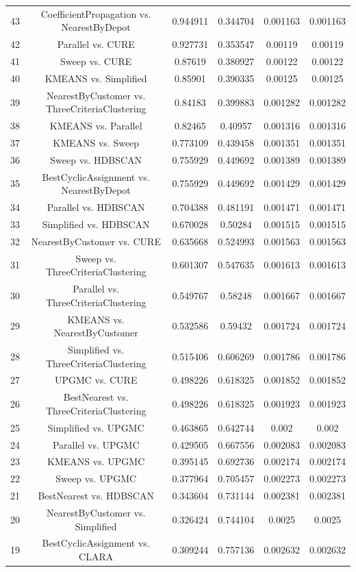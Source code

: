 \documentclass[a4paper,10pt]{article}
\begin{document}
\begin{landscape}
\begin{table}[!htp]
\begin{tabular}{cccccc}
43&CoefficientPropagation vs. NearestByDepot&0.944911&0.344704&0.001163&0.001163\\
42&Parallel vs. CURE&0.927731&0.353547&0.00119&0.00119\\
41&Sweep vs. CURE&0.87619&0.380927&0.00122&0.00122\\
40&KMEANS vs. Simplified&0.85901&0.390335&0.00125&0.00125\\
39&NearestByCustomer vs. ThreeCriteriaClustering&0.84183&0.399883&0.001282&0.001282\\
38&KMEANS vs. Parallel&0.82465&0.40957&0.001316&0.001316\\
37&KMEANS vs. Sweep&0.773109&0.439458&0.001351&0.001351\\
36&Sweep vs. HDBSCAN&0.755929&0.449692&0.001389&0.001389\\
35&BestCyclicAssignment vs. NearestByDepot&0.755929&0.449692&0.001429&0.001429\\
34&Parallel vs. HDBSCAN&0.704388&0.481191&0.001471&0.001471\\
33&Simplified vs. HDBSCAN&0.670028&0.50284&0.001515&0.001515\\
32&NearestByCustomer vs. CURE&0.635668&0.524993&0.001563&0.001563\\
31&Sweep vs. ThreeCriteriaClustering&0.601307&0.547635&0.001613&0.001613\\
30&Parallel vs. ThreeCriteriaClustering&0.549767&0.58248&0.001667&0.001667\\
29&KMEANS vs. NearestByCustomer&0.532586&0.59432&0.001724&0.001724\\
28&Simplified vs. ThreeCriteriaClustering&0.515406&0.606269&0.001786&0.001786\\
27&UPGMC vs. CURE&0.498226&0.618325&0.001852&0.001852\\
26&BestNearest vs. ThreeCriteriaClustering&0.498226&0.618325&0.001923&0.001923\\
25&Simplified vs. UPGMC&0.463865&0.642744&0.002&0.002\\
24&Parallel vs. UPGMC&0.429505&0.667556&0.002083&0.002083\\
23&KMEANS vs. UPGMC&0.395145&0.692736&0.002174&0.002174\\
22&Sweep vs. UPGMC&0.377964&0.705457&0.002273&0.002273\\
21&BestNearest vs. HDBSCAN&0.343604&0.731144&0.002381&0.002381\\
20&NearestByCustomer vs. Simplified&0.326424&0.744104&0.0025&0.0025\\
19&BestCyclicAssignment vs. CLARA&0.309244&0.757136&0.002632&0.002632\\

\end{tabular}
\end{table}
\end{landscape}
\end{document}
